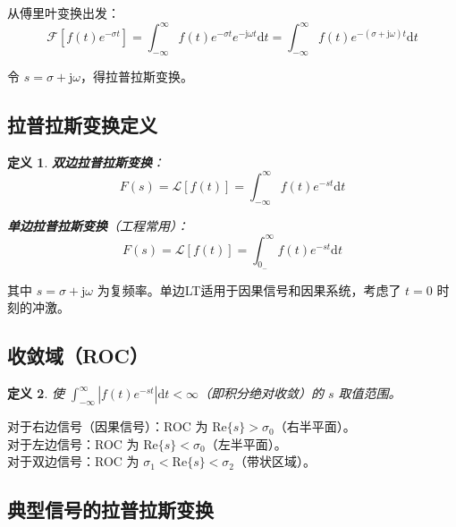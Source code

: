 \documentclass[11pt,a4paper]{ctexart}
\newtheorem{definition}{定义}[section]
\newcommand{\FT}{\mathcal{F}}           %
\newcommand{\LT}{\mathcal{L}}           %
\newcommand{\jj}{\mathrm{j}}            %
\newcommand{\dd}{\mathrm{d}}            %
\begin{document}
从傅里叶变换出发：
\[
\FT[f(t)e^{-\sigma t}] = \int_{-\infty}^{\infty} f(t)e^{-\sigma t}e^{-\jj\omega t}\dd t = \int_{-\infty}^{\infty} f(t)e^{-(\sigma+\jj\omega)t}\dd t
\]

令 $s = \sigma + \jj\omega$，得拉普拉斯变换。

\subsection{拉普拉斯变换定义}

\begin{definition}
\textbf{双边拉普拉斯变换}：
\[
F(s) = \LT[f(t)] = \int_{-\infty}^{\infty} f(t)e^{-st}\dd t
\]

\textbf{单边拉普拉斯变换}（工程常用）：
\[
F(s) = \LT[f(t)] = \int_{0_-}^{\infty} f(t)e^{-st}\dd t
\]
\end{definition}

其中 $s = \sigma + \jj\omega$ 为复频率。单边LT适用于因果信号和因果系统，考虑了 $t = 0$ 时刻的冲激。

\subsection{收敛域（ROC）}

\begin{definition}
使 $\int_{-\infty}^{\infty} |f(t)e^{-st}|\dd t < \infty$（即积分绝对收敛）的 $s$ 取值范围。
\end{definition}

对于右边信号（因果信号）：ROC 为 $\mathrm{Re}\{s\} > \sigma_0$（右半平面）。\\
对于左边信号：ROC 为 $\mathrm{Re}\{s\} < \sigma_0$（左半平面）。\\
对于双边信号：ROC 为 $\sigma_1 < \mathrm{Re}\{s\} < \sigma_2$（带状区域）。

\subsection{典型信号的拉普拉斯变换}
\end{document}
